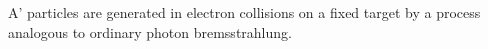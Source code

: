 \documentclass[b1]{sciposter}
\begin{document}
\begin{multicols}{3}
	A' particles are generated in electron collisions on a fixed target by a process analogous to
	ordinary photon bremsstrahlung.






\end{multicols}
\end{document}
